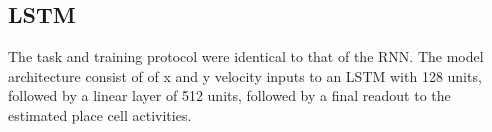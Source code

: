 \documentclass{article}
\begin{document}
\subsection{LSTM}
The task and training protocol were identical to that of the RNN.
The model architecture consist of of x and y velocity inputs to an LSTM with 128 units, followed by a linear layer of 512 units, followed by a final readout to the estimated place cell activities.



\end{document}
